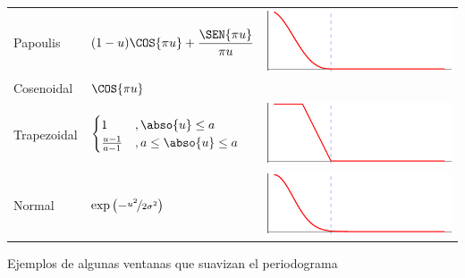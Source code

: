 \begin{SidewaysTable}
{\begin{tabular}{lll}
\rowcolor{gris}
Papoulis &
$\displaystyle 
(1-u)\COS{\pi u} + \frac{\SEN{\pi u }}{\pi u }
$
& \includegraphics[scale=.66]{./img_ventanas/ventana_papoulis.pdf}
\\
Cosenoidal &
$\displaystyle 
\COS{\pi u}
$
\\
\rowcolor{gris}
Trapezoidal &
$\displaystyle 
\begin{cases}
1 &, \abso{u}\leq a \\
\frac{u-1}{a-1} &, a \leq \abso{u}\leq a 
\end{cases}
$
& \includegraphics[scale=.66]{./img_ventanas/ventana_trapezoidal.pdf}
\\
Normal &
$\displaystyle 
\exp \left( - \nicefrac{u^{2}}{2 \sigma^{2}}  \right)
$
& \includegraphics[scale=.66]{./img_ventanas/ventana_.pdf}
\\
\bottomrule
\end{tabular}
}
\caption{Ejemplos de algunas ventanas que suavizan el periodograma}
\end{SidewaysTable}


